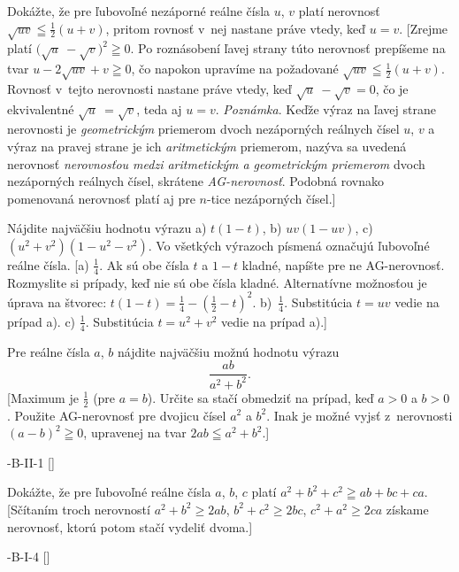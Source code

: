 {
Dokážte, že pre ľubovoľné nezáporné reálne čísla $u$, $v$ platí nerovnosť
$\sqrt{uv}\leqq\frac12(u+v)$, pritom rovnosť v~nej nastane práve vtedy, keď $u=v$. [Zrejme platí $\bigl(\sqrt u~-\sqrt v\bigr)^2\geqq0$. Po roznásobení ľavej strany túto nerovnosť prepíšeme na tvar $u-2\sqrt{uv}+v\geqq0$, čo napokon upravíme na požadované $\sqrt{uv}\leqq\frac12(u+v)$. Rovnosť v~tejto nerovnosti nastane práve vtedy, keď $\sqrt u~-\sqrt v=0$, čo je ekvivalentné $\sqrt u~=\sqrt v$, teda aj $u=v$.
{\it Poznámka}. Keďže výraz na ľavej strane nerovnosti je {\it geometrickým\/} priemerom dvoch nezáporných reálnych čísel $u$, $v$ a výraz na pravej strane je ich {\it aritmetickým\/} priemerom, nazýva sa uvedená nerovnosť {\it nerovnosťou medzi aritmetickým a geometrickým priemerom\/} dvoch nezáporných reálnych čísel, skrátene {\it AG-nerovnosť}. Podobná rovnako pomenovaná nerovnosť platí aj pre $n$-tice nezáporných čísel.]

Nájdite najväčšiu hodnotu výrazu
a) $t(1-t)$, b) $uv(1-uv)$, c) $(u^2+v^2)(1-u^2-v^2)$. Vo všetkých
výrazoch písmená označujú ľubovoľné reálne čísla.
[a) $\frac14$. Ak sú obe čísla $t$ a $1-t$ kladné, napíšte pre ne
AG-nerovnosť. Rozmyslite si prípady, keď nie sú obe čísla kladné.
Alternatívne možnosťou je úprava na štvorec:
$t(1-t)=\frac14-(\frac12-t)^2$. b)~$\frac14$. Substitúcia $t=uv$ vedie na
prípad a). c) $\frac14$. Substitúcia $t=u^2+v^2$ vedie na prípad a).]

\DOP
Pre reálne čísla $a$, $b$ nájdite najväčšiu možnú hodnotu výrazu
$$
\frac{ab}{a^2+b^2}.
$$
[Maximum je $\frac12$ (pre $a=b$). Určite sa stačí obmedziť na prípad, keď
$a>0$ a ${b>0}$. Použite AG-nerovnosť pre dvojicu čísel $a^2$ a $b^2$.
Inak je možné vyjsť z~nerovnosti $({a-b})^2\geqq0$, upravenej
na tvar $2ab\leqq a^2+b^2$.]

-B-II-1
[]

Dokážte, že pre ľubovoľné reálne
čísla $a$, $b$, $c$ platí $a^2+b^2+c^2\geqq ab+bc+ca$.
[Sčítaním troch nerovností $a^2+b^2\geq 2ab$, $b^2+c^2\geq 2bc$,
$c^2+a^2\geq 2ca$ získame nerovnosť, ktorú potom stačí vydeliť
dvoma.]

-B-I-4
[]
}

